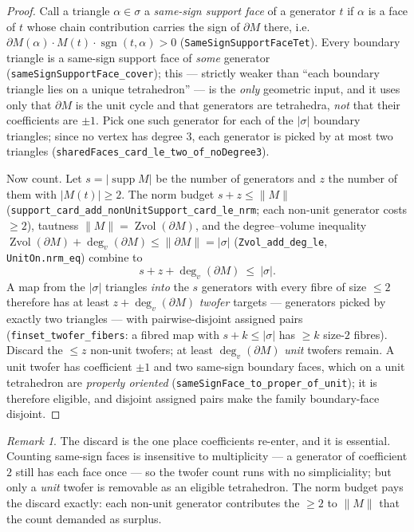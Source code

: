 \documentclass[11pt]{article}
\theoremstyle{plain}
\theoremstyle{definition}
\theoremstyle{remark}
\newtheorem*{remark}{Remark}
\newcommand{\Zvol}{\operatorname{Zvol}}
\newcommand{\supp}{\operatorname{supp}}
\newcommand{\bd}{\partial}
\newcommand{\code}[1]{\texttt{#1}}
\newcommand{\card}[1]{\lvert #1\rvert}
\newcommand{\norm}[1]{\lVert #1\rVert}
\begin{document}
\begin{proof}
Call a triangle $\alpha\in\sigma$ a \emph{same-sign support face} of a generator $t$ if
$\alpha$ is a face of $t$ whose chain contribution carries the sign of $\bd M$ there, i.e.\
$\bd M(\alpha)\cdot M(t)\cdot\operatorname{sgn}(t,\alpha)>0$
(\code{SameSignSupportFaceTet}). Every boundary triangle is a same-sign support face of
\emph{some} generator (\code{sameSignSupportFace\_cover}); this --- strictly weaker than ``each
boundary triangle lies on a unique tetrahedron'' --- is the \emph{only} geometric input, and
it uses only that $\bd M$ is the unit cycle and that generators are tetrahedra, \emph{not} that
their coefficients are $\pm1$. Pick one such generator for each of the $\card\sigma$ boundary
triangles; since no vertex has degree $3$, each generator is picked by at most two triangles
(\code{sharedFaces\_card\_le\_two\_of\_noDegree3}).

Now count. Let $s=\card{\supp M}$ be the number of generators and $z$ the number of them with
$\card{M(t)}\ge 2$. The norm budget $s+z\le\norm M$
(\code{support\_card\_add\_nonUnitSupport\_card\_le\_nrm}; each non-unit generator costs
$\ge 2$), tautness $\norm M=\Zvol(\bd M)$, and the degree--volume inequality
$\Zvol(\bd M)+\deg_v(\bd M)\le\norm{\bd M}=\card\sigma$ (\code{Zvol\_add\_deg\_le},
\code{UnitOn.nrm\_eq}) combine to
\[
s+z+\deg_v(\bd M)\ \le\ \card\sigma .
\]
A map from the $\card\sigma$ triangles \emph{into} the $s$ generators with every fibre of size
$\le 2$ therefore has at least $z+\deg_v(\bd M)$ \emph{twofer} targets --- generators picked by
exactly two triangles --- with pairwise-disjoint assigned pairs (\code{finset\_twofer\_fibers}: a
fibred map with $s+k\le\card\sigma$ has $\ge k$ size-$2$ fibres). Discard the $\le z$ non-unit
twofers; at least $\deg_v(\bd M)$ \emph{unit} twofers remain. A unit twofer has coefficient
$\pm1$ and two same-sign boundary faces, which on a unit tetrahedron are \emph{properly
oriented} (\code{sameSignFace\_to\_proper\_of\_unit}); it is therefore eligible, and disjoint
assigned pairs make the family boundary-face disjoint.
\end{proof}

\begin{remark}
The discard is the one place coefficients re-enter, and it is essential. Counting same-sign
faces is insensitive to multiplicity --- a generator of coefficient $2$ still has each face
once --- so the twofer count runs with no simpliciality; but only a \emph{unit} twofer is
removable as an eligible tetrahedron. The norm budget pays the discard exactly: each non-unit
generator contributes the $\ge 2$ to $\norm M$ that the count demanded as surplus.
\end{remark}
\end{document}
